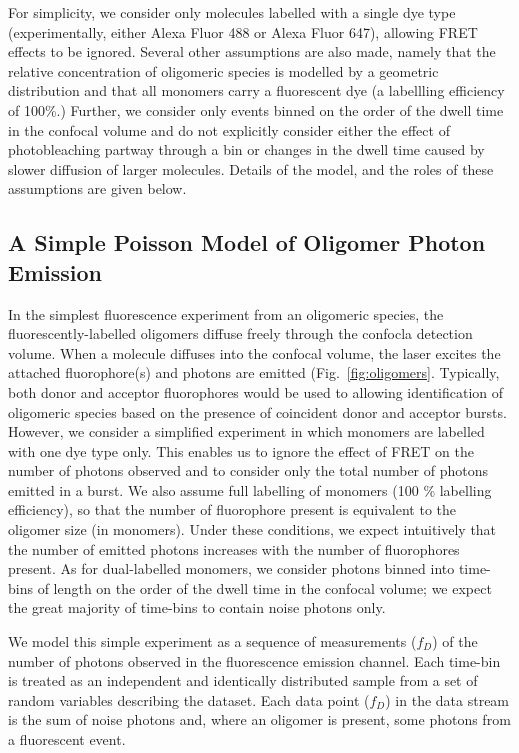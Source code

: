 For simplicity, we consider only molecules labelled with a single dye type (experimentally, either Alexa Fluor 488 or Alexa Fluor 647), allowing FRET effects to be ignored. Several other assumptions are also made, namely that the relative concentration of oligomeric species is modelled by a geometric distribution and that all monomers carry a fluorescent dye (a labellling efficiency of 100\%.) Further, we consider only events binned on the order of the dwell time in the confocal volume and do not explicitly consider either the effect of photobleaching partway through a bin or changes in the dwell time caused by slower diffusion of larger molecules. Details of the model, and the roles of these assumptions are given below.

\subsection{A Simple Poisson Model of Oligomer Photon Emission}
In the simplest fluorescence experiment from an oligomeric species, the fluorescently-labelled oligomers diffuse freely through the confocla detection volume.  When a molecule diffuses into the confocal volume, the laser excites the attached fluorophore(s) and photons are emitted (Fig.~\ref{fig:oligomers}. Typically, both donor and acceptor fluorophores would be used to allowing identification of oligomeric species based on the presence of coincident donor and acceptor bursts. However, we consider a simplified experiment in which monomers are labelled with one dye type only. This enables us to ignore the effect of FRET on the number of photons observed and to consider only the total number of photons emitted in a burst. We also assume full labelling of monomers (100 \% labelling efficiency), so that the number of fluorophore present is equivalent to the oligomer size (in monomers). Under these conditions, we expect intuitively that the number of emitted photons increases with the number of fluorophores present. As for dual-labelled monomers, we consider photons binned into time-bins of length on the order of the dwell time in the confocal volume; we expect the great majority of time-bins to contain noise photons only.

We model this simple experiment as a sequence of measurements ($f_D$) of the number of photons observed in the fluorescence emission channel. Each time-bin is treated as an independent and identically distributed sample from a set of random variables describing the dataset. Each data point ($f_D$) in the data stream is the sum of noise photons and, where an oligomer is present, some photons from a fluorescent event. 

